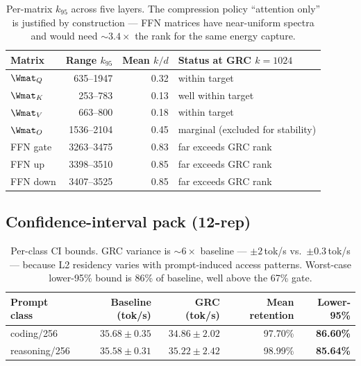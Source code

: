 \documentclass[11pt]{article}
\begin{document}
\begin{table}[h]\centering\footnotesize
\caption{Per-matrix $k_{95}$ across five layers. The compression policy
``attention only'' is justified by construction --- FFN matrices have
near-uniform spectra and would need ${\sim}3.4\times$ the rank for the
same energy capture.}
\begin{tabular}{@{}lrrl@{}}
\toprule
\textbf{Matrix} & \textbf{Range $k_{95}$} & \textbf{Mean $k/d$} & \textbf{Status at GRC $k{=}1024$}\\
\midrule
$\Wmat_Q$    & 635--1947  & 0.32 & within target\\
$\Wmat_K$    & 253--783   & 0.13 & well within target\\
$\Wmat_V$    & 663--800   & 0.18 & within target\\
$\Wmat_O$    & 1536--2104 & 0.45 & marginal (excluded for stability)\\
FFN gate     & 3263--3475 & 0.83 & far exceeds GRC rank\\
FFN up       & 3398--3510 & 0.85 & far exceeds GRC rank\\
FFN down     & 3407--3525 & 0.85 & far exceeds GRC rank\\
\bottomrule
\end{tabular}
\end{table}

\subsection{Confidence-interval pack (12-rep)}

\begin{table}[h]\centering\footnotesize
\caption{Per-class CI bounds. GRC variance is ${\sim}6\times$ baseline ---
$\pm 2$\,tok/s vs.\ $\pm 0.3$\,tok/s --- because L2 residency varies with
prompt-induced access patterns. Worst-case lower-95\% bound is 86\% of
baseline, well above the 67\% gate.}
\begin{tabular}{@{}lrrrr@{}}
\toprule
\textbf{Prompt class} & \textbf{Baseline (tok/s)} & \textbf{GRC (tok/s)} & \textbf{Mean retention} & \textbf{Lower-95\%}\\
\midrule
coding/256     & $35.68\!\pm\!0.35$ & $34.86\!\pm\!2.02$ & 97.70\% & \textbf{86.60\%}\\
reasoning/256  & $35.58\!\pm\!0.31$ & $35.22\!\pm\!2.42$ & 98.99\% & \textbf{85.64\%}\\
\bottomrule
\end{tabular}
\end{table}
\end{document}

